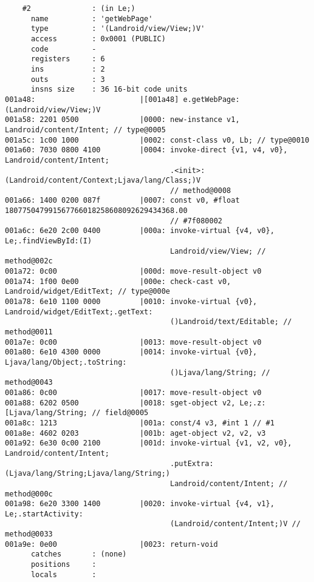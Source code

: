 \begin{lstlisting}
    #2              : (in Le;)
      name          : 'getWebPage'
      type          : '(Landroid/view/View;)V'
      access        : 0x0001 (PUBLIC)
      code          -
      registers     : 6
      ins           : 2
      outs          : 3
      insns size    : 36 16-bit code units
001a48:                        |[001a48] e.getWebPage:(Landroid/view/View;)V
001a58: 2201 0500              |0000: new-instance v1, Landroid/content/Intent; // type@0005
001a5c: 1c00 1000              |0002: const-class v0, Lb; // type@0010
001a60: 7030 0800 4100         |0004: invoke-direct {v1, v4, v0}, Landroid/content/Intent;
                                      .<init>:(Landroid/content/Context;Ljava/lang/Class;)V
                                      // method@0008
001a66: 1400 0200 087f         |0007: const v0, #float 180775047991567766018258608092629434368.00
                                      // #7f080002
001a6c: 6e20 2c00 0400         |000a: invoke-virtual {v4, v0}, Le;.findViewById:(I)
                                      Landroid/view/View; // method@002c
001a72: 0c00                   |000d: move-result-object v0
001a74: 1f00 0e00              |000e: check-cast v0, Landroid/widget/EditText; // type@000e
001a78: 6e10 1100 0000         |0010: invoke-virtual {v0}, Landroid/widget/EditText;.getText:
                                      ()Landroid/text/Editable; // method@0011
001a7e: 0c00                   |0013: move-result-object v0
001a80: 6e10 4300 0000         |0014: invoke-virtual {v0}, Ljava/lang/Object;.toString:
                                      ()Ljava/lang/String; // method@0043
001a86: 0c00                   |0017: move-result-object v0
001a88: 6202 0500              |0018: sget-object v2, Le;.z:[Ljava/lang/String; // field@0005
001a8c: 1213                   |001a: const/4 v3, #int 1 // #1
001a8e: 4602 0203              |001b: aget-object v2, v2, v3
001a92: 6e30 0c00 2100         |001d: invoke-virtual {v1, v2, v0}, Landroid/content/Intent;
                                      .putExtra:(Ljava/lang/String;Ljava/lang/String;)
                                      Landroid/content/Intent; // method@000c
001a98: 6e20 3300 1400         |0020: invoke-virtual {v4, v1}, Le;.startActivity:
                                      (Landroid/content/Intent;)V // method@0033
001a9e: 0e00                   |0023: return-void
      catches       : (none)
      positions     :
      locals        :


\end{lstlisting}
